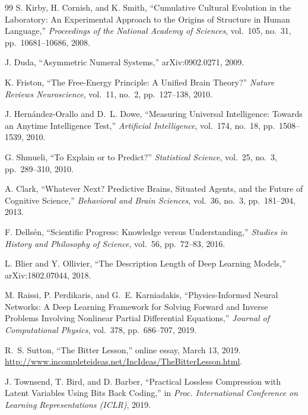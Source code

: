 \documentclass[11pt]{article}
\begin{document}
\begin{thebibliography}{99}
S. Kirby, H. Cornish, and K. Smith,
\newblock ``Cumulative Cultural Evolution in the Laboratory: An Experimental Approach to the Origins of Structure in Human Language,''
\newblock \emph{Proceedings of the National Academy of Sciences}, vol.~105, no.~31, pp.~10681--10686, 2008.

J. Duda,
\newblock ``Asymmetric Numeral Systems,''
\newblock arXiv:0902.0271, 2009.

K. Friston,
\newblock ``The Free-Energy Principle: A Unified Brain Theory?''
\newblock \emph{Nature Reviews Neuroscience}, vol.~11, no.~2, pp.~127--138, 2010.

J. Hern{\'a}ndez-Orallo and D.~L. Dowe,
\newblock ``Measuring Universal Intelligence: Towards an Anytime Intelligence Test,''
\newblock \emph{Artificial Intelligence}, vol.~174, no.~18, pp.~1508--1539, 2010.

G. Shmueli,
\newblock ``To Explain or to Predict?''
\newblock \emph{Statistical Science}, vol.~25, no.~3, pp.~289--310, 2010.

A. Clark,
\newblock ``Whatever Next? Predictive Brains, Situated Agents, and the Future of Cognitive Science,''
\newblock \emph{Behavioral and Brain Sciences}, vol.~36, no.~3, pp.~181--204, 2013.

F. Dells{\'e}n,
\newblock ``Scientific Progress: Knowledge versus Understanding,''
\newblock \emph{Studies in History and Philosophy of Science}, vol.~56, pp.~72--83, 2016.

L. Blier and Y. Ollivier,
\newblock ``The Description Length of Deep Learning Models,''
\newblock arXiv:1802.07044, 2018.

M. Raissi, P. Perdikaris, and G.~E. Karniadakis,
\newblock ``Physics-Informed Neural Networks: A Deep Learning Framework for Solving Forward and Inverse Problems Involving Nonlinear Partial Differential Equations,''
\newblock \emph{Journal of Computational Physics}, vol.~378, pp.~686--707, 2019.

R.~S. Sutton,
\newblock ``The Bitter Lesson,''
\newblock online essay, March 13, 2019.
\newblock \url{http://www.incompleteideas.net/IncIdeas/TheBitterLesson.html}.

J. Townsend, T. Bird, and D. Barber,
\newblock ``Practical Lossless Compression with Latent Variables Using Bits Back Coding,''
\newblock in \emph{Proc. International Conference on Learning Representations (ICLR)}, 2019.


\end{thebibliography}
\end{document}
